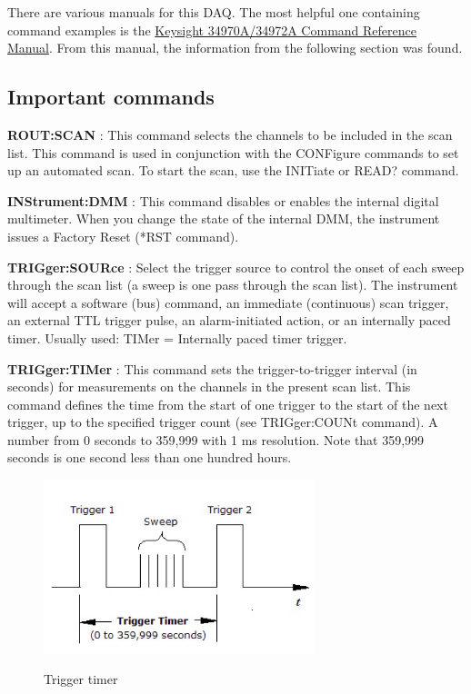 \documentclass[a4paper]{article}
\begin{document}
There are various manuals for this DAQ. The most helpful one containing command examples is the \href{https://documentation.help/Keysight-34970A-34972A/documentation.pdf}{Keysight 34970A/34972A Command Reference Manual}. From this manual, the information from the following section was found.

\subsection{Important commands}

\textbf{ROUT:SCAN} : This command selects the channels to be included in the scan list. This command is used in conjunction with the CONFigure commands to set up an automated scan. To start the scan, use the INITiate or READ? command.

\textbf{INStrument:DMM} : This command disables or enables the internal digital multimeter. When you change the state of the internal DMM, the instrument issues a Factory Reset (*RST command).

\textbf{TRIGger:SOURce} : Select the trigger source to control the onset of each sweep through the scan list (a sweep is one pass through the scan list). The instrument will accept a software (bus) command, an immediate (continuous) scan trigger, an external TTL trigger pulse, an alarm-initiated action, or an internally paced timer. Usually used: TIMer = Internally paced timer trigger.

\textbf{TRIGger:TIMer} : This command sets the trigger-to-trigger interval (in seconds) for measurements on the channels in the present scan list. This command defines the time from the start of one trigger to the start of the next trigger, up to the specified trigger count (see TRIGger:COUNt command). A number from 0 seconds to 359,999 with 1 ms resolution. Note that 359,999 seconds is one second less than one hundred hours.


\begin{figure}[h!]
	\centering
	\includegraphics[width=0.7\textwidth]{trigger_timer.png}
	\label{fig:trigger_timer}
	\caption{Trigger timer}
\end{figure}
\end{document}
